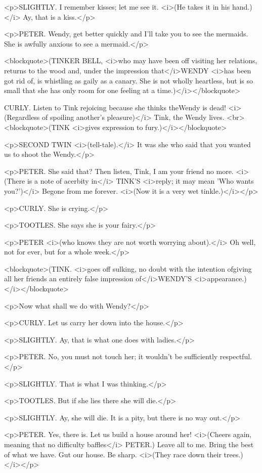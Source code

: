 <p>SLIGHTLY. I remember kisses; let me see it. <i>(He takes it in his
hand.)</i> Ay, that is a kiss.</p>

<p>PETER. Wendy, get better quickly and I'll take you to see the
mermaids. She is awfully anxious to see a mermaid.</p>

<blockquote>(TINKER BELL, <i>who may have been off visiting her
relations, returns to the wood and, under the impression
that</i>WENDY <i>has been got rid of, is whistling as gaily as a
canary. She is not wholly heartless, but is so small that she has
only room for one feeling at a time.)</i></blockquote>

CURLY. Listen to Tink rejoicing because she thinks theWendy is dead!
<i>(Regardless of spoiling another's pleasure)</i> Tink, the Wendy
lives. <br>
<blockquote>(TINK <i>gives expression to fury.)</i></blockquote>

<p>SECOND TWIN <i>(tell-tale).</i> It was she who said that you
wanted us to shoot the Wendy.</p>

<p>PETER. She said that? Then listen, Tink, I am your friend no more.
<i>(There is a note of acerbity in</i> TINK'S <i>reply; it may mean
'Who wants you?')</i> Begone from me forever. <i>(Now it is a very
wet tinkle.)</i></p>

<p>CURLY. She is crying.</p>

<p>TOOTLES. She says she is your fairy.</p>

<p>PETER <i>(who knows they are not worth worrying about).</i> Oh
well, not for ever, but for a whole week.</p>

<blockquote>(TINK. <i>goes off sulking, no doubt with the intention
ofgiving all her friends an entirely false impression of</i>WENDY'S
<i>appearance.)</i></blockquote>

<p>Now what shall we do with Wendy?</p>

<p>CURLY. Let us carry her down into the house.</p>

<p>SLIGHTLY. Ay, that is what one does with ladies.</p>

<p>PETER. No, you must not touch her; it wouldn't be sufficiently
respectful.</p>

<p>SLIGHTLY. That is what I was thinking.</p>

<p>TOOTLES. But if she lies there she will die.</p>

<p>SLIGHTLY. Ay, she will die. It is a pity, but there is no way
out.</p>

<p>PETER. Yes, there is. Let us build a house around her! <i>(Cheers
again, meaning that no difficulty baffles</i> PETER.) Leave all to
me. Bring the best of what we have. Gut our house. Be sharp. <i>(They
race down their trees.)</i></p>


